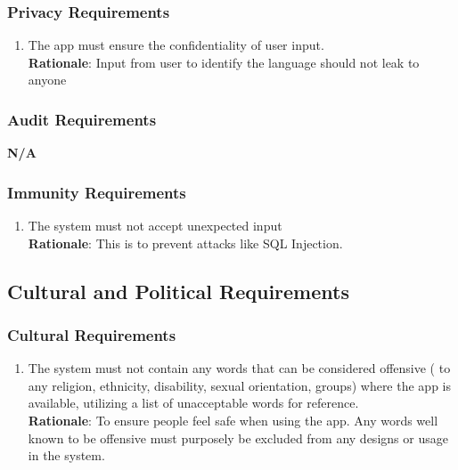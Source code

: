 \subsubsection{Privacy Requirements}
\label{ssub:privacy_requirements}
\begin{enumerate}[{SR-P}1. ]
	\item The app must ensure the confidentiality of user input. 
	\\ \textbf{Rationale}: Input from user to identify the language should not leak to anyone 
\end{enumerate}

\subsubsection{Audit Requirements}
\label{ssub:audit_requirements}
\textbf{N/A}

\subsubsection{Immunity Requirements}
\label{ssub:immunity_requirements}
\begin{enumerate}[{SR-IM}1. ]
	\item The system must not accept unexpected input
	\\ \textbf{Rationale}: This is to prevent attacks like SQL Injection.
\end{enumerate}


\subsection{Cultural and Political Requirements}
\label{sub:cultural_and_political_requirements}

\subsubsection{Cultural Requirements}
\label{ssub:cultural_requirements}
\begin{enumerate}[{CP-C}1. ]
	\item The system must not contain any words that can be considered offensive ( to any religion, ethnicity, disability, sexual orientation, groups) where the app is available, utilizing a list of unacceptable words for reference.
	\\ \textbf{Rationale}: To ensure people feel safe when using the app.  Any words well known to be offensive must purposely be 	excluded from any designs or usage in the system. 
\end{enumerate}

